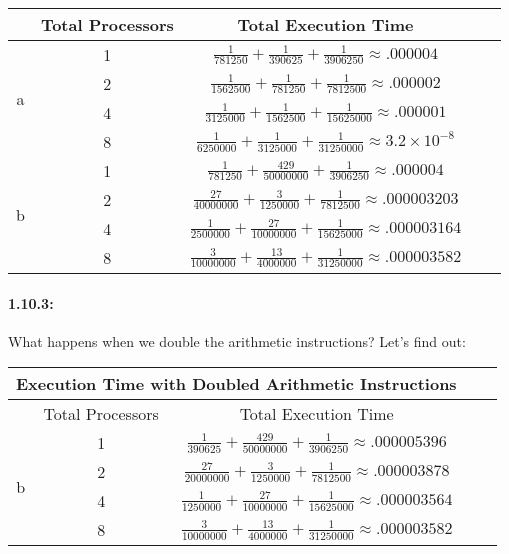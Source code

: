 \documentclass[a4paper]{article}
\begin{document}
\begin{center}
\begin{tabular}{|c|c|c|c|c|c|}
\hline
& Total Processors & \multicolumn{2}{|c|}{Total Execution Time}\\
\hline
\multirow{4}{*}{a} & 1 & \multicolumn{2}{|c|}{$\frac{1}{781250} + \frac{1}{390625} + \frac{1}{3906250} \approx .000004$}\\
& 2 & \multicolumn{2}{|c|}{$\frac{1}{1562500} + \frac{1}{781250} + \frac{1}{7812500} \approx .000002$}\\
& 4 & \multicolumn{2}{|c|}{$\frac{1}{3125000} + \frac{1}{1562500} + \frac{1}{15625000} \approx .000001$}\\
& 8 & \multicolumn{2}{|c|}{$\frac{1}{6250000} + \frac{1}{3125000} + \frac{1}{31250000} \approx 3.2\times10^{-8}$}\\
\hline
\hline
\multirow{4}{*}{b} & 1 & \multicolumn{2}{|c|}{$\frac{1}{781250} + \frac{429}{50000000} + \frac{1}{3906250} \approx .000004$}\\
& 2 & \multicolumn{2}{|c|}{$\frac{27}{40000000} + \frac{3}{1250000} + \frac{1}{7812500} \approx .000003203$}\\
& 4 & \multicolumn{2}{|c|}{$\frac{1}{2500000} + \frac{27}{10000000} + \frac{1}{15625000} \approx .000003164$}\\
& 8 & \multicolumn{2}{|c|}{$\frac{3}{10000000} + \frac{13}{4000000} + \frac{1}{31250000} \approx .000003582$}\\
\hline
\end{tabular}
\end{center}

\paragraph*{1.10.3:} What happens when we double the arithmetic instructions? Let's find out:

\begin{center}
\begin{tabular}{|c|c|c|c|c|c|}
\hline
\multicolumn{4}{|c|}{Execution Time with Doubled Arithmetic Instructions}\\
\hline
\hline
& Total Processors & \multicolumn{2}{|c|}{Total Execution Time}\\
\hline
\multirow{4}{*}{b} & 1 & \multicolumn{2}{|c|}{$\frac{1}{390625} + \frac{429}{50000000} + \frac{1}{3906250} \approx .000005396$}\\
& 2 & \multicolumn{2}{|c|}{$\frac{27}{20000000} + \frac{3}{1250000} + \frac{1}{7812500} \approx .000003878$}\\
& 4 & \multicolumn{2}{|c|}{$\frac{1}{1250000} + \frac{27}{10000000} + \frac{1}{15625000} \approx .000003564$}\\
& 8 & \multicolumn{2}{|c|}{$\frac{3}{10000000} + \frac{13}{4000000} + \frac{1}{31250000} \approx .000003582$}\\
\hline
\end{tabular}
\end{center}
\end{document}
